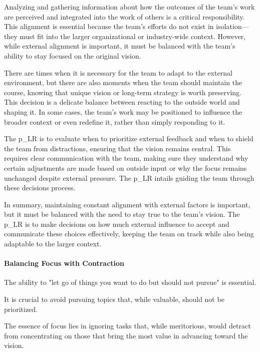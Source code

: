 Analyzing and gathering information about how the outcomes of the team's work are perceived and integrated into the work of others is a critical responsibility. This alignment is essential because the team's efforts do not exist in isolation—they must fit into the larger organizational or industry-wide context. However, while external alignment is important, it must be balanced with the team’s ability to stay focused on the original vision. 

There are times when it is necessary for the team to adapt to the external environment, but there are also moments when the team should maintain the course, knowing that unique vision or long-term strategy is worth preserving. This decision is a delicate balance between reacting to the outside world and shaping it. In some cases, the team’s work may be positioned to influence the broader context or even redefine it, rather than simply responding to it.

The \gls{p_LR} is to evaluate when to prioritize external feedback and when to shield the team from distractions, ensuring that the vision remains central. This requires clear communication with the team, making sure they understand why certain adjustments are made based on outside input or why the focus remains unchanged despite external pressure. The \gls{p_LR} intails guiding the team through these decisions process.

In summary, maintaining constant alignment with external factors is important, but it must be balanced with the need to stay true to the team’s vision. The \gls{p_LR} is to make decisions on how much external influence to accept and communicate these choices effectively, keeping the team on track while also being adaptable to the larger context.

\paragraph{Balancing Focus with Contraction}

The ability to "let go of things you want to do but should not pursue" is essential.

It is crucial to avoid pursuing topics that, while valuable, should not be prioritized. \begin{center} The essence of focus lies in ignoring tasks that, while meritorious, would detract from concentrating on those that bring the most value in advancing toward the vision. \end{center}

